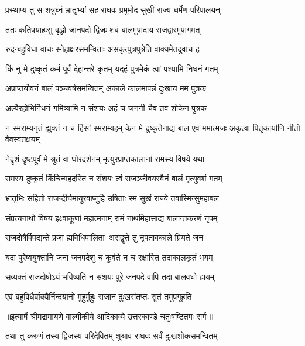 \twolineshloka
{प्रस्थाप्य तु स शत्रुघ्नं भ्रातृभ्यां सह राघवः}
{प्रमुमोद सुखी राज्यं धर्मेण परिपालयन्} %

\twolineshloka
{ततः कतिपयाहःसु वृद्धो जानपदो द्विजः}
{शवं बालमुपादाय राजद्वारमुपागमत्} %

\twolineshloka
{रुदन्बहुविधा वाचः स्नेहाक्षरसमन्विताः}
{असकृत्पुत्रपुत्रेति वाक्यमेतदुवाच ह} %

\twolineshloka
{किं नु मे दुष्कृतं कर्म पूर्वं देहान्तरे कृतम्}
{यदहं पुत्रमेकं त्वां पश्यामि निधनं गतम्} %

\twolineshloka
{अप्राप्तयौवनं बालं पञ्चवर्षसमन्वितम्}
{अकाले कालमापन्नं दुःखाय मम पुत्रक} %

\twolineshloka
{अल्पैरहोभिर्निधनं गमिष्यामि न संशयः}
{अहं च जननी चैव तव शोकेन पुत्रक} %

\threelineshloka
{न स्मराम्यनृतं ह्युक्तं न च हिंसां स्मराम्यहम्}
{केन मे दुष्कृतेनाद्य बाल एव ममात्मजः}
{अकृत्वा पितृकार्याणि नीतो वैवस्वतक्षयम्} %

\twolineshloka
{नेदृशं दृष्टपूर्वं मे श्रुतं वा घोरदर्शनम्}
{मृत्युरप्राप्तकालानां रामस्य विषये यथा} %

\twolineshloka
{रामस्य दुष्कृतं किंचिन्महदस्ति न संशयः}
{त्वं राजञ्जीवयस्वैनं बालं मृत्युवशं गतम्} %

\twolineshloka
{भ्रातृभिः सहितो राजन्दीर्घमायुरवाप्नुहि}
{उषिताः स्म सुखं राज्ये तवास्मिन्सुमहाबल} %

\twolineshloka
{संप्रत्यनाथो विषय इक्ष्वाकूणां महात्मनाम्}
{रामं नाथमिहासाद्य बालान्तकरणं नृपम्} %

\twolineshloka
{राजदोषैर्विपद्यन्ते प्रजा ह्यविधिपालिताः}
{असद्वृत्ते तु नृपतावकाले म्रियते जनः} %

\twolineshloka
{यदा पुरेष्वयुक्तानि जना जनपदेशु च}
{कुर्वते न च रक्षास्ति तदाकालकृतं भयम्} %

\twolineshloka
{सव्यक्तं राजदोषोऽयं भविष्यति न संशयः}
{पुरे जनपदे वापि तदा बालवधो ह्ययम्} %

\twolineshloka
{एवं बहुविधैर्वाक्यैर्निन्दयानो मुहुर्मुहुः}
{राजानं दुःखसंतप्तः सुतं तमुपगूहति} %


{॥इत्यार्षे श्रीमद्रामायणे वाल्मीकीये आदिकाव्ये उत्तरकाण्डे चतुःषष्टितमः सर्गः॥}


\twolineshloka
{तथा तु करुणं तस्य द्विजस्य परिदेवितम्}
{शुश्राव राघवः सर्वं दुःखशोकसमन्वितम्} %

